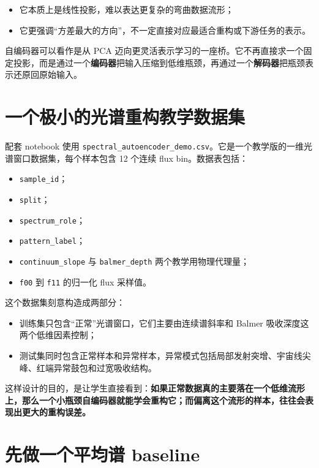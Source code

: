 \begin{itemize}
    \item 它本质上是线性投影，难以表达更复杂的弯曲数据流形；
    \item 它更强调“方差最大的方向”，不一定直接对应最适合重构或下游任务的表示。
\end{itemize}

自编码器可以看作是从 PCA 迈向更灵活表示学习的一座桥。它不再直接求一个固定投影，而是通过一个\textbf{编码器}把输入压缩到低维瓶颈，再通过一个\textbf{解码器}把瓶颈表示还原回原始输入。

\section{一个极小的光谱重构教学数据集}

配套 notebook 使用 \nolinkurl{spectral_autoencoder_demo.csv}。它是一个教学版的一维光谱窗口数据集，每个样本包含 12 个连续 flux bin。数据表包括：

\begin{itemize}
    \item \texttt{sample\_id}；
    \item \texttt{split}；
    \item \texttt{spectrum\_role}；
    \item \texttt{pattern\_label}；
    \item \texttt{continuum\_slope} 与 \texttt{balmer\_depth} 两个教学用物理代理量；
    \item \texttt{f00} 到 \texttt{f11} 的归一化 flux 采样值。
\end{itemize}

这个数据集刻意构造成两部分：

\begin{itemize}
    \item 训练集只包含“正常”光谱窗口，它们主要由连续谱斜率和 Balmer 吸收深度这两个低维因素控制；
    \item 测试集同时包含正常样本和异常样本，异常模式包括局部发射突增、宇宙线尖峰、红端异常鼓包和过宽吸收结构。
\end{itemize}

这样设计的目的，是让学生直接看到：\textbf{如果正常数据真的主要落在一个低维流形上，那么一个小瓶颈自编码器就能学会重构它；而偏离这个流形的样本，往往会表现出更大的重构误差。}

\section{先做一个平均谱 baseline}

